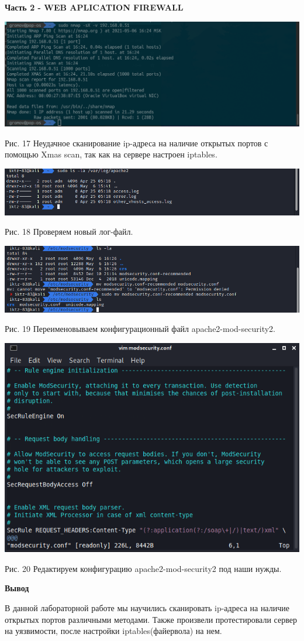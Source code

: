 \documentclass[a4paper,14pt]{extarticle}
\begin{document}
    \newpage
    \textbf{Часть 2 - WEB APLICATION FIREWALL}
    \begin{center}

        \singlespacing
        \includegraphics[scale=0.42]{pics/14.png}

        Рис. 17 Неудачное сканирование ip-адреса на наличие открытых портов с помощью Xmas scan, так как на сервере настроен iptables.
        \vspace{1ex}

        \includegraphics[scale=0.5]{pics/15.png}

        Рис. 18 Проверяем новый лог-файл.
        \vspace{1ex}

        \includegraphics[scale=0.5]{pics/16.png}

        Рис. 19 Переименовываем конфигурационный файл apache2-mod-security2.
        \vspace{1ex}

        \includegraphics[scale=0.55]{pics/17.png}

        Рис. 20 Редактируем конфигурацию apache2-mod-security2 под наши нужды.
    \end{center}

    \textbf{Вывод}

    В данной лабораторной работе мы научились сканировать ip-адреса на наличие 
    открытых портов различными методами. Также произвели протестировали сервер 
    на уязвимости, после настройки iptables(файервола) на нем. 
\end{document}
